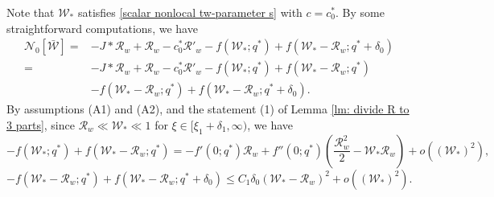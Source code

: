 \documentclass[11pt,a4paper]{article}
\numberwithin{equation}{section}
\numberwithin{figure}{section}
\begin{document}
Note that $\mathcal{W}_*$ satisfies \eqref{scalar nonlocal tw-parameter s} with $c=c_0^*$.
By some  straightforward computations, we have
\begin{equation}\label{N0 inequality step 1 nonlocal}
\begin{aligned}
\mathcal{N}_0[\bar{\mathcal{W}}]=&-J\ast \mathcal{R}_w+\mathcal{R}_w-c_0^*\mathcal{R}'_w-f(\mathcal{W}_*;q^*)+f(\mathcal{W}_*-\mathcal{R}_w;q^*+\delta_0)\\
=&-J\ast \mathcal{R}_w+\mathcal{R}_w-c_0^*\mathcal{R}'_w-f(\mathcal{W}_*;q^*)+f(\mathcal{W}_*-\mathcal{R}_w;q^*)\\
&-f(\mathcal{W}_*-\mathcal{R}_w;q^*)+f(\mathcal{W}_*-\mathcal{R}_w;q^*+\delta_0).
\end{aligned}
\end{equation}
By assumptions (A1) and (A2), and the statement (1) of Lemma \ref{lm: divide R to 3 parts}, since $\mathcal{R}_w\ll \mathcal{W}_*\ll 1$ for $\xi\in[\xi_1+\delta_1,\infty)$, we have
\begin{equation}\label{estimate 1 nonlocal}
-f(\mathcal{W}_*;q^*)+f(\mathcal{W}_*-\mathcal{R}_w;q^*)= -f'(0;q^*)\mathcal{R}_w+f''(0;q^*)(\frac{\mathcal{R}^2_w}{2}-\mathcal{W}_*\mathcal{R}_w)+o((\mathcal{W}_*)^2),
\end{equation}
\begin{equation}\label{estimate 2 nonlocal}
-f(\mathcal{W}_*-\mathcal{R}_w;q^*)+f(\mathcal{W}_*-\mathcal{R}_w;q^*+\delta_0)\le C_1\delta_0(\mathcal{W}_*-\mathcal{R}_w)^2+o((\mathcal{W}_*)^2).
\end{equation}
\end{document}
